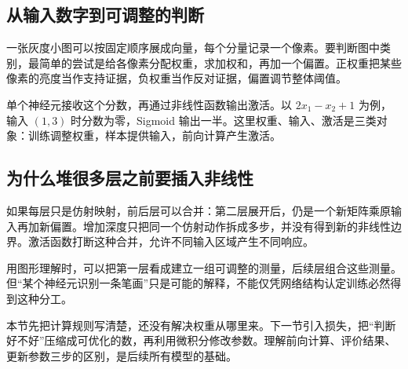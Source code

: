 \subsection*{从输入数字到可调整的判断}
一张灰度小图可以按固定顺序展成向量，每个分量记录一个像素。要判断图中类别，最简单的尝试是给各像素分配权重，求加权和，再加一个偏置。正权重把某些像素的亮度当作支持证据，负权重当作反对证据，偏置调节整体阈值。

单个神经元接收这个分数，再通过非线性函数输出激活。以 $2x_1-x_2+1$ 为例，输入 $(1,3)$ 时分数为零，Sigmoid 输出一半。这里权重、输入、激活是三类对象：训练调整权重，样本提供输入，前向计算产生激活。

\subsection*{为什么堆很多层之前要插入非线性}
如果每层只是仿射映射，前后层可以合并：第二层展开后，仍是一个新矩阵乘原输入再加新偏置。增加深度只把同一个仿射动作拆成多步，并没有得到新的非线性边界。激活函数打断这种合并，允许不同输入区域产生不同响应。

用图形理解时，可以把第一层看成建立一组可调整的测量，后续层组合这些测量。但“某个神经元识别一条笔画”只是可能的解释，不能仅凭网络结构认定训练必然得到这种分工。

本节先把计算规则写清楚，还没有解决权重从哪里来。下一节引入损失，把“判断好不好”压缩成可优化的数，再利用微积分修改参数。理解前向计算、评价结果、更新参数三步的区别，是后续所有模型的基础。
